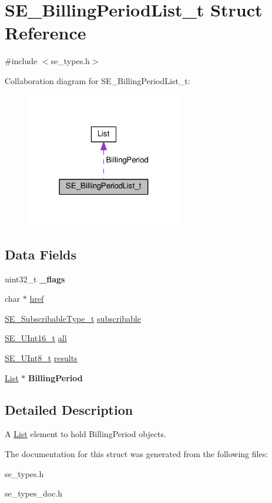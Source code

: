 \hypertarget{structSE__BillingPeriodList__t}{}\section{S\+E\+\_\+\+Billing\+Period\+List\+\_\+t Struct Reference}
\label{structSE__BillingPeriodList__t}


{\ttfamily \#include $<$se\+\_\+types.\+h$>$}



Collaboration diagram for S\+E\+\_\+\+Billing\+Period\+List\+\_\+t\+:\nopagebreak
\begin{figure}[H]
\begin{center}
\leavevmode
\includegraphics[width=195pt]{structSE__BillingPeriodList__t__coll__graph}
\end{center}
\end{figure}
\subsection*{Data Fields}
\begin{DoxyCompactItemize}
\item 
uint32\+\_\+t {\bfseries \+\_\+flags}
\item 
char $\ast$ \hyperlink{group__BillingPeriodList_ga25178fff55f503152774d69d8a90203d}{href}
\item 
\hyperlink{group__SubscribableType_ga5c41f553d369710ed34619266bf2551e}{S\+E\+\_\+\+Subscribable\+Type\+\_\+t} \hyperlink{group__BillingPeriodList_ga8640613b3a337e43533d8476ab44133d}{subscribable}
\item 
\hyperlink{group__UInt16_gac68d541f189538bfd30cfaa712d20d29}{S\+E\+\_\+\+U\+Int16\+\_\+t} \hyperlink{group__BillingPeriodList_ga989aa3386d8c97fd6463ef916625f7e0}{all}
\item 
\hyperlink{group__UInt8_gaf7c365a1acfe204e3a67c16ed44572f5}{S\+E\+\_\+\+U\+Int8\+\_\+t} \hyperlink{group__BillingPeriodList_gadc844269764abba471b730d50aad225e}{results}
\item 
\hyperlink{structList}{List} $\ast$ {\bfseries Billing\+Period}
\end{DoxyCompactItemize}


\subsection{Detailed Description}
A \hyperlink{structList}{List} element to hold Billing\+Period objects. 

The documentation for this struct was generated from the following files\+:\begin{DoxyCompactItemize}
\item 
se\+\_\+types.\+h\item 
se\+\_\+types\+\_\+doc.\+h\end{DoxyCompactItemize}
